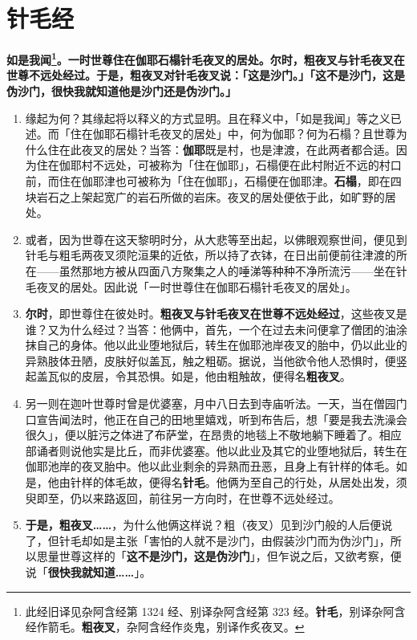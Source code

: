 \section{针毛经}

\textbf{如是我闻\footnote{此经旧译见杂阿含经第 1324 经、别译杂阿含经第 323 经。\textbf{针毛}，别译杂阿含经作箭毛。\textbf{粗夜叉}，杂阿含经作炎鬼，别译作炙夜叉。}。一时世尊住在伽耶石榻针毛夜叉的居处。尔时，粗夜叉与针毛夜叉在世尊不远处经过。于是，粗夜叉对针毛夜叉说：「这是沙门。」「这不是沙门，这是伪沙门，很快我就知道他是沙门还是伪沙门。」}

\begin{enumerate}\item 缘起为何？其缘起将以释义的方式显明。且在释义中，「如是我闻」等之义已述。而「住在伽耶石榻针毛夜叉的居处」中，何为伽耶？何为石榻？且世尊为什么住在此夜叉的居处？当答：\textbf{伽耶}既是村，也是津渡，在此两者都合适。因为住在伽耶村不远处，可被称为「住在伽耶」，石榻便在此村附近不远的村口前，而住在伽耶津也可被称为「住在伽耶」，石榻便在伽耶津。\textbf{石榻}，即在四块岩石之上架起宽广的岩石所做的岩床。夜叉的居处便依于此，如旷野的居处。
\item 或者，因为世尊在这天黎明时分，从大悲等至出起，以佛眼观察世间，便见到针毛与粗毛两夜叉须陀洹果的近依，所以持了衣钵，在日出前便前往津渡的所在——虽然那地方被从四面八方聚集之人的唾涕等种种不净所流污——坐在针毛夜叉的居处。因此说「一时世尊住在伽耶石榻针毛夜叉的居处」。
\item \textbf{尔时}，即世尊住在彼处时。\textbf{粗夜叉与针毛夜叉在世尊不远处经过}，这些夜叉是谁？又为什么经过？当答：他俩中，首先，一个在过去未问便拿了僧团的油涂抹自己的身体。他以此业堕地狱后，转生在伽耶池岸夜叉的胎中，仍以此业的异熟肢体丑陋，皮肤好似盖瓦，触之粗砺。据说，当他欲令他人恐惧时，便竖起盖瓦似的皮层，令其恐惧。如是，他由粗触故，便得名\textbf{粗夜叉}。
\item 另一则在迦叶世尊时曾是优婆塞，月中八日去到寺庙听法。一天，当在僧园门口宣告闻法时，他正在自己的田地里嬉戏，听到布告后，想「要是我去洗澡会很久」，便以脏污之体进了布萨堂，在昂贵的地毯上不敬地躺下睡着了。相应部诵者则说他实是比丘，而非优婆塞。他以此业及其它的业堕地狱后，转生在伽耶池岸的夜叉胎中。他以此业剩余的异熟而丑恶，且身上有针样的体毛。如是，他由针样的体毛故，便得名\textbf{针毛}。他俩为至自己的行处，从居处出发，须臾即至，仍以来路返回，前往另一方向时，在世尊不远处经过。
\item \textbf{于是，粗夜叉……}，为什么他俩这样说？粗（夜叉）见到沙门般的人后便说了，但针毛却如是主张「害怕的人就不是沙门，由假装沙门而为伪沙门」，所以思量世尊这样的「\textbf{这不是沙门，这是伪沙门}」，但乍说之后，又欲考察，便说「\textbf{很快我就知道……}」。\end{enumerate}

